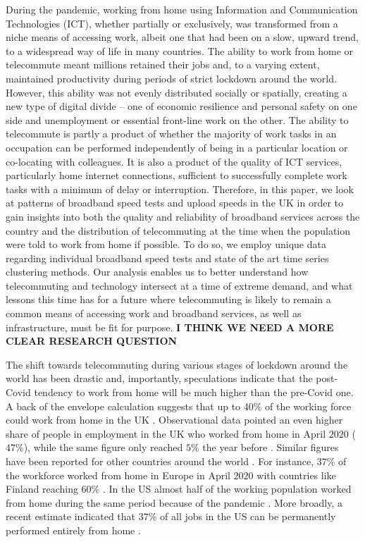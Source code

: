 \documentclass[]{interact}
\theoremstyle{plain}%
\theoremstyle{definition}
\theoremstyle{remark}
\begin{document}
During the pandemic, working from home using Information and
Communication Technologies (ICT), whether partially or exclusively, was
transformed from a niche means of accessing work, albeit one that had
been on a slow, upward trend, to a widespread way of life in many
countries. The ability to work from home or telecommute meant millions
retained their jobs and, to a varying extent, maintained productivity
during periods of strict lockdown around the world. However, this
ability was not evenly distributed socially or spatially, creating a new
type of digital divide -- one of economic resilience and personal safety
on one side and unemployment or essential front-line work on the other.
The ability to telecommute is partly a product of whether the majority
of work tasks in an occupation can be performed independently of being
in a particular location or co-locating with colleagues. It is also a
product of the quality of ICT services, particularly home internet
connections, sufficient to successfully complete work tasks with a
minimum of delay or interruption. Therefore, in this paper, we look at
patterns of broadband speed tests and upload speeds in the UK in order
to gain insights into both the quality and reliability of broadband
services across the country and the distribution of telecommuting at the
time when the population were told to work from home if possible. To do
so, we employ unique data regarding individual broadband speed tests and
state of the art time series clustering methods. Our analysis enables us
to better understand how telecommuting and technology intersect at a
time of extreme demand, and what lessons this time has for a future
where telecommuting is likely to remain a common means of accessing work
and broadband services, as well as infrastructure, must be fit for
purpose. \textbf{I THINK WE NEED A MORE CLEAR RESEARCH QUESTION}

The shift towards telecommuting during various stages of lockdown around
the world has been drastic and, importantly, speculations indicate that
the post-Covid tendency to work from home will be much higher than the
pre-Covid one. A back of the envelope calculation suggests that up to
40\% of the working force could work from home in the UK
\citep{batty2020editorial}. Observational data pointed an even higher
share of people in employment in the UK who worked from home in April
\(2020\) (\(47\)\%), while the same figure only reached \(5\)\% the year
before \citep{ons2020, ons2020lm2019}. Similar figures have been
reported for other countries around the world
\citep{felstead2020homeworking}. For instance, \(37\)\% of the workforce
worked from home in Europe in April \(2020\) with countries like Finland
reaching \(60\)\% \citep{eurofound2020}. In the US almost half of the
working population worked from home during the same period because of
the pandemic \citep{brynjolfsson2020covid}. More broadly, a recent
estimate indicated that \(37\)\% of all jobs in the US can be
permanently performed entirely from home \citep{NBERw26948}.
\end{document}
